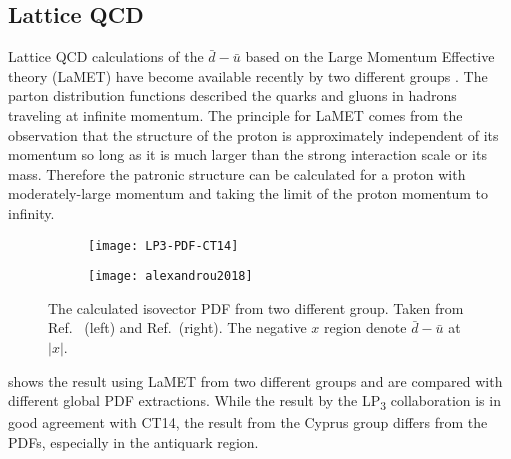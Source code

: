 \documentclass[../main.tex]{subfiles}
\begin{document}
\subsection{Lattice QCD}
Lattice QCD calculations of the $\bar{d} - \bar{u}$ based on the Large Momentum Effective
theory (LaMET) \cite{ji2021} have become available recently by two different groups \cite{chen2018, alexandrou2018}. 
The parton distribution functions described the quarks and gluons in hadrons traveling at infinite
momentum. The principle for LaMET comes from the observation that the structure of the proton is
approximately independent of its momentum so long as it is much larger than the strong interaction
scale or its mass. Therefore the patronic structure can be calculated for a proton with
moderately-large momentum and taking the limit of the proton momentum to infinity.

\begin{figure}[h!]
\centering
\begin{subfigure}{0.45\linewidth}
\texttt{[image: LP3-PDF-CT14]}
\end{subfigure}
\begin{subfigure}{0.45\linewidth}
\texttt{[image: alexandrou2018]}
\end{subfigure}
\caption{The calculated isovector PDF from two different group. Taken from Ref.~\cite{chen2018} (left)
and Ref.~\cite{alexandrou2018}(right). The negative $x$ region denote $\bar{d}-\bar{u}$ at $\left|x\right|$.}
\label{fig:lamet}
\end{figure}
 shows the result using LaMET from two different groups and are compared with
different global PDF extractions. While the result by the LP\textsubscript{3} collaboration
is in good agreement with CT14, the result from the Cyprus group differs from the PDFs,
especially in the antiquark region.
\end{document}
